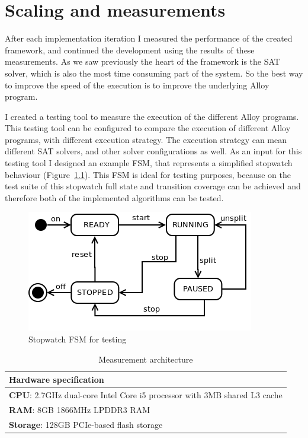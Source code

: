 \chapter{Scaling and measurements}
\label{cha:measurements}

After each implementation iteration I measured the performance of the created framework, and continued the development using the results of these measurements. As we saw previously the heart of the framework is the SAT solver, which is also the most time consuming part of the system. So the best way to improve the speed of the execution is to improve the underlying Alloy program.

I created a testing tool to measure the execution of the different Alloy programs. This testing tool can be configured to compare the execution of different Alloy programs, with different execution strategy. The execution strategy can mean different SAT solvers, and other solver configurations as well. As an input for this testing tool I designed an example FSM, that represents a simplified stopwatch behaviour (Figure~\ref{fig:measurements_stopwatch}). This FSM is ideal for testing purposes, because on the test suite of this stopwatch full state and transition coverage can be achieved and therefore both of the implemented algorithms can be tested.

\begin{figure}[htp]
\centering
\includegraphics[scale=0.5]{figures/measurements_stopwatch}
\caption{Stopwatch FSM for testing}
\label{fig:measurements_stopwatch}
\end{figure}

\begin{table}[htb]
\begin{center}
\begin{tabular}{|l|}
\hline
	\textbf{Hardware specification}\\\hline
	\textbf{CPU}: 2.7GHz dual-core Intel Core i5 processor with 3MB shared L3 cache\\
	\textbf{RAM}: 8GB 1866MHz LPDDR3 RAM\\
	\textbf{Storage}: 128GB PCIe-based flash storage\\
\hline
\end{tabular}
\end{center}
\caption{\label{tab:hardwarespecification} Measurement architecture}
\end{table}


